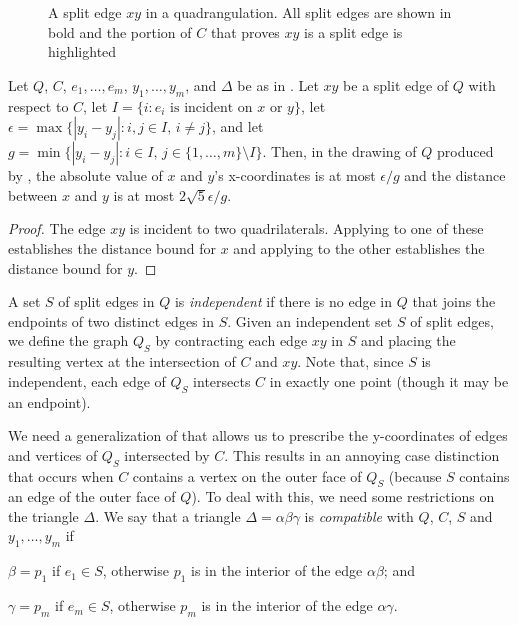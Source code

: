 \documentclass{patmorin}
\begin{document}
\begin{figure}
   \caption{A split edge $xy$ in a quadrangulation.  All split edges are shown in bold and the portion of $C$ that proves $xy$ is a split edge is highlighted}
\end{figure}

\begin{cor}
  Let $Q$, $C$, $e_1,\ldots,e_m$, $y_1,\ldots,y_m$, and $\Delta$
  be as in .  Let $xy$ be a split edge of $Q$ with
  respect to $C$, let $I=\{i:\text{$e_i$ is incident on $x$ or
  $y$}\}$, let $\epsilon=\max\{|y_i-y_j|:i,j\in I,\, i\neq j\}$, and
  let $g=\min\{|y_i-y_j|: i\in I,\, j\in\{1,\ldots,m\}\setminus I\}$.
  Then, in the drawing of $Q$ produced by , the absolute
  value of $x$ and $y$'s x-coordinates is at most $\epsilon/g$ and the
  distance between $x$ and $y$ is at most $2\sqrt{5}\epsilon/g$.
\end{cor}

\begin{proof}
   The edge $xy$ is incident to two quadrilaterals. Applying
    to one of these establishes the distance bound
   for $x$ and applying  to the other establishes
   the distance bound for $y$.
\end{proof}

A set $S$ of split edges in $Q$ is \emph{independent} if there is no
edge in $Q$ that joins the endpoints of two distinct edges in $S$.
Given an independent set $S$ of split edges, we define the graph $Q_S$
by contracting each edge $xy$ in $S$ and placing the resulting vertex at
the intersection of $C$ and $xy$.  Note that, since $S$ is independent,
each edge of $Q_S$ intersects $C$ in exactly one point (though it may
be an endpoint).

We need a generalization of  that allows us to prescribe
the y-coordinates of edges and vertices of $Q_S$ intersected by $C$.
This results in an annoying case distinction that occurs when $C$ contains
a vertex on the outer face of $Q_S$ (because $S$ contains an edge of the
outer face of $Q$).  To deal with this, we need some restrictions on the
triangle $\Delta$.  We say that a triangle $\Delta=\alpha\beta\gamma$
is \emph{compatible} with $Q$, $C$, $S$ and $y_1,\ldots,y_m$ if
\begin{compactenum}
  \item $\beta=p_1$ if $e_1\in S$, otherwise $p_1$ is in the interior
  of the edge $\alpha\beta$; and
  \item $\gamma=p_m$ if $e_m\in S$, otherwise $p_m$ is in the interior
  of the edge $\alpha\gamma$.
\end{compactenum}
\end{document}
